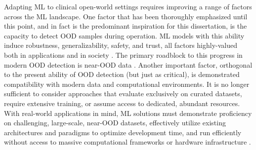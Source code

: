 Adapting ML to clinical open-world settings requires improving a range of factors across the ML landscape. One factor that has been thoroughly emphasized until this point, and in fact is the predominant inspiration for this dissertation, is the capacity to detect OOD samples during operation. ML models with this ability induce robustness, generalizability, safety, and trust, all factors highly-valued both in applications and in society \cite{siau2018building,hendrycks2022x,hendrycks2021unsolved,amodei2016concrete,nitsch2021out}. The primary roadblock to this progress in modern OOD detection is near-OOD data \cite{yang2022openood,winkens2020contrastive}.
Another important factor, orthogonal to the present ability of OOD detection (but just as critical), is demonstrated compatibility with modern data and computational environments. It is no longer sufficient to consider approaches that evaluate exclusively on curated datasets, require extensive training, or assume access to dedicated, abundant resources. With real-world applications in mind, ML solutions must demonstrate proficiency on challenging, large-scale, near-OOD datasets, effectively utilize existing architectures and paradigms to optimize development time, and run efficiently without access to massive computational frameworks or hardware infrastructure \cite{li2025secure,wang2025enabling,yuhas2021embedded,lu2025out}.

